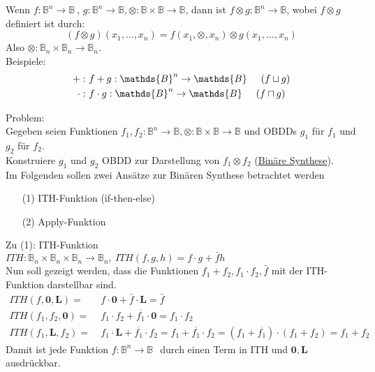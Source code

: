 \documentclass[ngerman]{scrartcl}
\theoremstyle{custom}
\newcommand{\0}{\mathbf{0}}
\newcommand{\1}{\mathbf{L}}
\newcommand{\bol}{\mathds{B}^n \rightarrow \mathds{B}}
\newcommand{\bolf}{$f: \bol~$}
\begin{document}
Wenn \bolf, $g: \mathds{B}^n \rightarrow \mathds{B}, \otimes:
\mathds{B} \times \mathds{B} \rightarrow \mathds{B}$, dann ist $f
\otimes g: \mathds{B}^n \rightarrow \mathds{B}$, wobei $f \otimes g$
definiert ist durch:
\begin{equation*}
(f \otimes g)(x_1,\dots,x_n) = f(x_1,\otimes,x_n) \otimes g(x_1,\dots,x_n)
\end{equation*}
Also $\otimes :  \mathds{B}_n \times \mathds{B}_n \rightarrow
\mathds{B}_n$.\\

Beispiele:
\begin{align*}
+:& ~f + g: \mathds{B}^n \rightarrow \mathds{B} \hspace{0.5cm} (f
\sqcup g)\\
\cdot:& ~f \cdot g: \mathds{B}^n \rightarrow \mathds{B} \hspace{0.5cm} (f
\sqcap g)
\end{align*}

Problem:\\
Gegeben seien Funktionen $f_1,f_2: \mathds{B}^n \rightarrow \mathds{B},
\otimes: \mathds{B} \times \mathds{B} \rightarrow \mathds{B}$ und
OBDDs $g_1$ f\"ur $f_1$ und $g_2$ f\"ur $f_2$.\\
Konstruiere $g_1$ und $g_2$ OBDD zur Darstellung von $f_1 \otimes f_2$
(\underline{Bin\"are Synthese}).\\

Im Folgenden sollen zwei Ans\"atze zur Bin\"aren Synthese betrachtet
werden
\begin{itemize}
\item[(1)] ITH-Funktion (if-then-else)
\item[(2)] Apply-Funktion
\end{itemize}

Zu (1): ITH-Funktion\\
$ITH: \mathds{B}_n \times \mathds{B}_n \times \mathds{B}_n \rightarrow
\mathds{B}_n, ~ITH(f,g,h) = f \cdot g + \bar f h$\\

Nun soll gezeigt werden, dass die Funktionen $f_1+f_2, f_1 \cdot f_2,
\bar f$ mit der ITH-Funktion darstellbar sind.
\begin{align*}
ITH(f,\0, \1) =&~ f \cdot \0 + \bar f \cdot \1 = \bar f \\
ITH(f_1,f_2, \0 ) =&~ f_1 \cdot f_2 + \overline{f_1} \cdot \0 = f_1 \cdot
f_2\\
ITH(f_1,\1,f_2) = &~ f_1 \cdot \1 + \overline{f_1} \cdot f_2 = f_1 +
\overline{f_1} \cdot f_2 = (f_1 + \overline{f_1}) \cdot (f_1 + f_2) = f_1 + f_2
\end{align*}
Damit ist jede Funktion \bolf ~durch einen Term in ITH und $\0,\1$
ausdr\"uckbar.\\
\end{document}
